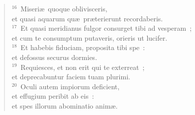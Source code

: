 \begin{flushleft}
\begin{verse}
${}^{16}$~Miseri\ae\ quoque oblivisceris,\\ et quasi aquarum qu\ae\ pr\ae terierunt recordaberis.\\
${}^{17}$~Et quasi meridianus fulgor consurget tibi ad vesperam~;\\ et cum te consumptum putaveris, orieris ut lucifer.\\
${}^{18}$~Et habebis fiduciam, proposita tibi spe~:\\ et defossus securus dormies.\\
${}^{19}$~Requiesces, et non erit qui te exterreat~;\\ et deprecabuntur faciem tuam plurimi.\\
${}^{20}$~Oculi autem impiorum deficient,\\ et effugium peribit ab eis~:\\ et spes illorum abominatio anim\ae .\end{verse}\end{flushleft}



